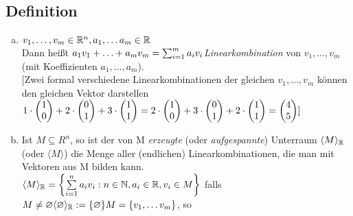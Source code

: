 \subsection{Definition}\label{sec:0.6}
\begin{enumerate}[a)]
\item$v_1,\ldots , v_m \in \mathbb{R}^n, a_1,\ldots a_m \in \mathbb{R}$\\
Dann hei\ss t $a_1v_1 + \ldots + a_m v_m = \sum_{i = 1}^{m} a_iv_i\\
$\emph{Linearkombination} von $v_1,\ldots ,v_m$ (mit Koeffizienten $a_1,\ldots,a_m$).\\
$[ $Zwei formal verschiedene Linearkombinationen der gleichen $v_1,\ldots, v_m$ können den gleichen Vektor darstellen \\
$1 \cdot \begin{pmatrix}
1\\0
\end{pmatrix} + 2 \cdot \begin{pmatrix}
0\\1
\end{pmatrix} + 3 \cdot \begin{pmatrix}
1\\1
\end{pmatrix} = 2 \cdot \begin{pmatrix}
1\\0
\end{pmatrix} + 3 \cdot \begin{pmatrix}
0\\1
\end{pmatrix} + 2 \cdot \begin{pmatrix}
1\\1
\end{pmatrix} = \begin{pmatrix}
4\\5
\end{pmatrix}]$
\item Ist $M \subseteq R^n$, so ist der von M \emph{erzeugte} (oder \emph{aufgespannte}) Unterraum $\langle M \rangle_{\mathbb{R}}$ (oder $\langle M \rangle$) die Menge aller (endlichen) Linearkombinationen, die man mit Vektoren aus M bilden kann.\\
$\langle M \rangle_{\mathbb{R}} = \left\{ \sum\limits_{i=1}^{n}a_iv_i : n\in\mathbb{N} , a_i \in\mathbb{R} ,v_i\in M \right\}$ falls $M \ne \varnothing\\
\langle\varnothing\rangle_{\mathbb{R}} := \{ \varnothing \}\\
M = \{ v_1,\ldots v_m \}$, so %
\end{enumerate}
